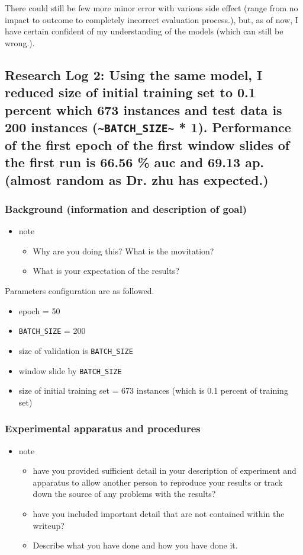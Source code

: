 \documentclass[11pt]{article}
\begin{document}
There could still be few more minor error with various side effect (range from no impact to outcome to completely incorrect evaluation process.), but, as of now, I have certain confident of my understanding of the models (which can still be wrong.).
\subsection{Research Log 2: Using the same model, I reduced size of initial training set to 0.1 percent which 673 instances and test data is 200 instances (\texttt{\textasciitilde{}BATCH\_SIZE\textasciitilde{}} * 1). Performance of the first epoch of the first window slides of the first run is 66.56 \% auc and 69.13 ap. (almost random as Dr. zhu has expected.)}
\label{sec:orgaf10d95}
\subsubsection{Background (information and description of goal)}
\label{sec:orgfe154f3}
\begin{itemize}
\item note
\begin{itemize}
\item Why are you doing this? What is the movitation?
\item What is your expectation of the results?
\end{itemize}
\end{itemize}

Parameters configuration are as followed.

\begin{itemize}
\item epoch = 50
\item \texttt{BATCH\_SIZE} = 200
\item size of validation is \texttt{BATCH\_SIZE}
\item window slide by \texttt{BATCH\_SIZE}
\item size of initial training set = 673 instances (which is 0.1 percent of training set)
\end{itemize}

\subsubsection{Experimental apparatus and procedures}
\label{sec:org6f8d928}
\begin{itemize}
\item note
\begin{itemize}
\item have you provided sufficient detail in your description of experiment and apparatus to allow another person to reproduce your results or track down the source of any problems with the results?
\item have you included important detail that are not contained within the writeup?
\item Describe what you have done and how you have done it.
\end{itemize}
\end{itemize}
\end{document}
